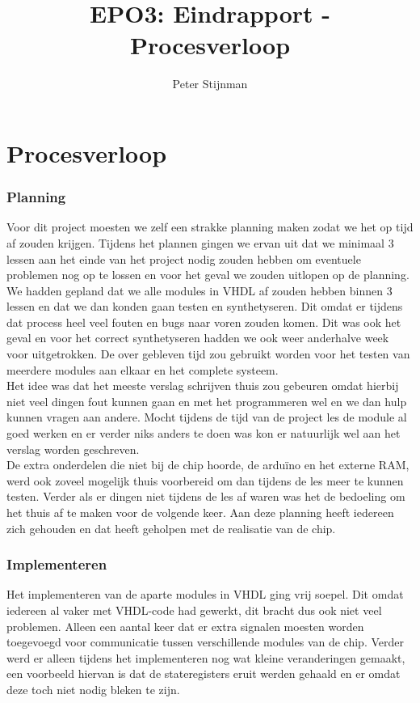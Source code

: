 \documentclass{scrartcl} %
\author{Peter Stijnman}
\title{EPO3: Eindrapport - Procesverloop}
\begin{document}
\chapter{Procesverloop}
\label{ch:procesverloop}

\subsection{ Planning}

Voor dit project moesten we zelf een strakke planning maken zodat we het op tijd af zouden krijgen. Tijdens het plannen gingen we ervan uit dat we minimaal 3 lessen aan het einde van het project nodig zouden hebben om eventuele problemen nog op te lossen
en voor het geval we zouden uitlopen op de planning. We hadden gepland dat we alle modules in VHDL af zouden hebben binnen 3 lessen en dat we dan konden gaan testen en synthetyseren. Dit omdat er tijdens dat process heel veel fouten en bugs naar voren zouden komen.
Dit was ook het geval en voor het correct synthetyseren hadden we ook weer anderhalve week voor uitgetrokken. De over gebleven tijd zou gebruikt worden voor het testen van meerdere modules aan elkaar en het complete systeem.\\
Het idee was dat het meeste verslag schrijven thuis zou gebeuren omdat hierbij niet veel dingen fout kunnen gaan en met het programmeren wel en we dan hulp kunnen vragen aan andere. Mocht tijdens de tijd van de project les de module al goed werken en er verder niks 
anders te doen was kon er natuurlijk wel aan het verslag worden geschreven.\\ De extra onderdelen die niet bij de chip hoorde, de arduïno en het externe RAM, werd ook zoveel mogelijk thuis voorbereid om dan tijdens de les meer te kunnen testen. Verder als er dingen niet 
tijdens de les af waren was het de bedoeling om het thuis af te maken voor de volgende keer. Aan deze planning heeft iedereen zich gehouden en dat heeft geholpen met de realisatie van de chip.

\subsection{Implementeren}

Het implementeren van de aparte modules in VHDL ging vrij soepel. Dit omdat iedereen al vaker met VHDL-code had gewerkt, dit bracht dus ook niet veel problemen. Alleen een aantal keer dat er extra signalen moesten worden toegevoegd voor communicatie tussen 
verschillende modules van de chip. Verder werd er alleen tijdens het implementeren nog wat kleine veranderingen gemaakt, een voorbeeld hiervan is dat de stateregisters eruit werden gehaald en er omdat deze toch niet nodig bleken te zijn. 
\end{document}
